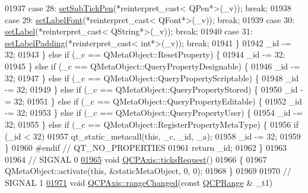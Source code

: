 \begin{DoxyCode}
01937         \textcolor{keywordflow}{case} 28: \hyperlink{a00025_aede4028ae7516bd51a60618a8233f9cf}{setSubTickPen}(*reinterpret\_cast< QPen*>(\_v)); \textcolor{keywordflow}{break};
01938         \textcolor{keywordflow}{case} 29: \hyperlink{a00025_a71ac1a47f7547e490a8c4311d1433cf3}{setLabelFont}(*reinterpret\_cast< QFont*>(\_v)); \textcolor{keywordflow}{break};
01939         \textcolor{keywordflow}{case} 30: \hyperlink{a00025_a33bcc382c111c9f31bb0687352a2dea4}{setLabel}(*reinterpret\_cast< QString*>(\_v)); \textcolor{keywordflow}{break};
01940         \textcolor{keywordflow}{case} 31: \hyperlink{a00025_a4391192a766e5d20cfe5cbc17607a7a2}{setLabelPadding}(*reinterpret\_cast< int*>(\_v)); \textcolor{keywordflow}{break};
01941         \}
01942         \_id -= 32;
01943     \} \textcolor{keywordflow}{else} \textcolor{keywordflow}{if} (\_c == QMetaObject::ResetProperty) \{
01944         \_id -= 32;
01945     \} \textcolor{keywordflow}{else} \textcolor{keywordflow}{if} (\_c == QMetaObject::QueryPropertyDesignable) \{
01946         \_id -= 32;
01947     \} \textcolor{keywordflow}{else} \textcolor{keywordflow}{if} (\_c == QMetaObject::QueryPropertyScriptable) \{
01948         \_id -= 32;
01949     \} \textcolor{keywordflow}{else} \textcolor{keywordflow}{if} (\_c == QMetaObject::QueryPropertyStored) \{
01950         \_id -= 32;
01951     \} \textcolor{keywordflow}{else} \textcolor{keywordflow}{if} (\_c == QMetaObject::QueryPropertyEditable) \{
01952         \_id -= 32;
01953     \} \textcolor{keywordflow}{else} \textcolor{keywordflow}{if} (\_c == QMetaObject::QueryPropertyUser) \{
01954         \_id -= 32;
01955     \} \textcolor{keywordflow}{else} \textcolor{keywordflow}{if} (\_c == QMetaObject::RegisterPropertyMetaType) \{
01956         \textcolor{keywordflow}{if} (\_id < 32)
01957             qt\_static\_metacall(\textcolor{keyword}{this}, \_c, \_id, \_a);
01958         \_id -= 32;
01959     \}
01960 \textcolor{preprocessor}{#endif // QT\_NO\_PROPERTIES}
01961     \textcolor{keywordflow}{return} \_id;
01962 \}
01963 
01964 \textcolor{comment}{// SIGNAL 0}
\hypertarget{a00067_source_l01965}{}\hyperlink{a00025_af46d99613d29518795134ec4928e3873}{01965} \textcolor{keywordtype}{void} \hyperlink{a00025_af46d99613d29518795134ec4928e3873}{QCPAxis::ticksRequest}()
01966 \{
01967     QMetaObject::activate(\textcolor{keyword}{this}, &staticMetaObject, 0, 0);
01968 \}
01969 
01970 \textcolor{comment}{// SIGNAL 1}
\hypertarget{a00067_source_l01971}{}\hyperlink{a00025_a0894084e4c16a1736534c4095746f910}{01971} \textcolor{keywordtype}{void} \hyperlink{a00025_a0894084e4c16a1736534c4095746f910}{QCPAxis::rangeChanged}(\textcolor{keyword}{const} \hyperlink{a00049}{QCPRange} & \_t1)

\end{DoxyCode}
